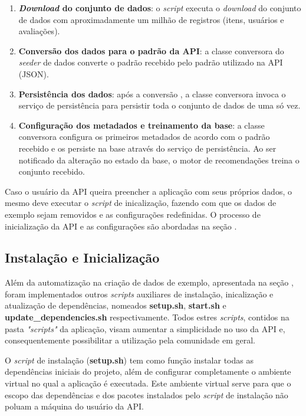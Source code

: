 \documentclass[12pt, openright, oneside, a4paper, brazil]{abntex2}
\begin{document}
\begin{enumerate}
	\item \textbf{\textit{Download} do conjunto de dados}: o \textit{script} executa o \textit{download} do conjunto de dados com aproximadamente um milhão de registros (itens, usuários e avaliações).

	\item \textbf{Conversão dos dados para o padrão da API}: a classe conversora do \textit{seeder} de dados converte o padrão recebido pelo padrão utilizado na API (JSON).

	\item \textbf{Persistência dos dados}: após a conversão , a classe conversora invoca o serviço de persistência para persistir toda o conjunto de dados de uma só vez.

	\item \textbf{Configuração dos metadados e treinamento da base}: a classe conversora configura os primeiros metadados de acordo com o padrão recebido e os persiste na base através do serviço de persistência. Ao ser notificado da alteração no estado da base, o motor de recomendações treina o conjunto recebido.
\end{enumerate}

Caso o usuário da API queira preencher a aplicação com seus próprios dados, o mesmo deve executar o \textit{script} de inicalização, fazendo com que os dados de exemplo sejam removidos e as configurações redefinidas. O processo de inicialização da API e as configurações são abordadas na seção .

\subsection{Instalação e Inicialização} \label{init}

Além da automatização na criação de dados de exemplo, apresentada na seção , foram implementados outros \textit{scripts} auxiliares de instalação, inicalização e atualização de dependências, nomeados \textbf{setup.sh}, \textbf{start.sh} e \textbf{update\_dependencies.sh} respectivamente. Todos estres \textit{scripts}, contidos na pasta \textit{"scripts"} da aplicação, visam aumentar a simplicidade no uso da API e, consequentemente possibilitar a utilização pela comunidade em geral.

O \textit{script} de instalação (\textbf{setup.sh}) tem como função instalar todas as dependências iniciais do projeto, além de configurar completamente o ambiente virtual no qual a aplicação é executada. Este ambiente virtual serve para que o escopo das dependências e dos pacotes instalados pelo \textit{script} de instalação não poluam a máquina do usuário da API.
\end{document}
